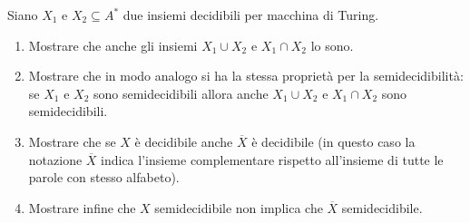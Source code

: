 \begin{ex}\label{ex:semidicibilità non è chiuso rispetto complementare}
Siano $X_1$ e $X_2\subseteq A^*$ due insiemi decidibili per macchina di Turing.
\begin{enumerate}
    \item Mostrare che anche gli insiemi $X_1\cup X_2$ e $X_1\cap X_2$ lo sono.
    \item Mostrare che in modo analogo si ha la stessa proprietà per la semidecidibilità: se $X_1$ e $X_2$ sono semidecidibili allora anche $X_1\cup X_2$ e $X_1\cap X_2$ sono semidecidibili.
    \item Mostrare che se $X$ è decidibile anche $\overline{X}$ è decidibile (in questo caso la notazione $\overline{X}$ indica l'insieme complementare rispetto all'insieme di tutte le parole con stesso alfabeto).
    \item Mostrare infine che $X$ semidecidibile non implica che $\overline{X}$ semidecidibile.
\end{enumerate}
\end{ex}

